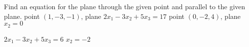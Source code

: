 
\begin{Exercise}[
name={},
title={}, 
difficulty=0,
origin={\cite{SM}}]
Find an equation for the plane through the given point and parallel to the given plane.
\Question point $(1,-3,-1)$, plane $2x_1-3x_2+5x_3=17$
\Question point $(0,-2,4)$, plane $x_2=0$
\end{Exercise}

\begin{Answer}
\Question $2x_1-3x_2+5x_3=6$
\Question $x_2=-2$
\end{Answer}
